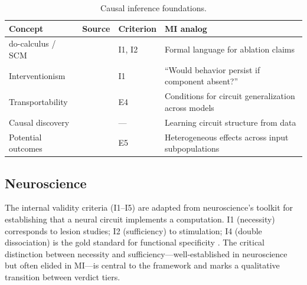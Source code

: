 \documentclass{article}
\begin{document}
\begin{table}[H]
\centering\small
\caption{Causal inference foundations.}
\renewcommand{\arraystretch}{1.12}
\begin{tabular}{@{}l>{\raggedright\arraybackslash}p{2.5cm}l>{\raggedright\arraybackslash}p{4.2cm}@{}}
\toprule
\textbf{Concept} & \textbf{Source} & \textbf{Criterion} & \textbf{MI analog} \\
\midrule
do-calculus / SCM & \citet{pearl2009causality} & I1, I2 & Formal language for ablation claims \\
\midrule
Interventionism & \citet{woodward2003making} & I1 & ``Would behavior persist if component absent?'' \\
\midrule
Transportability & \citet{pearl2011transportability} & E4 & Conditions for circuit generalization across models \\
\midrule
Causal discovery & \citet{spirtes2000causation} & --- & Learning circuit structure from data \\
\midrule
Potential outcomes & \citet{rubin1974estimating} & E5 & Heterogeneous effects across input subpopulations \\
\bottomrule
\end{tabular}
\end{table}


\subsection{Neuroscience}
\label{sec:neuro}

The internal validity criteria (I1--I5) are adapted from neuroscience's toolkit for establishing that a neural circuit implements a computation. I1 (necessity) corresponds to lesion studies; I2 (sufficiency) to stimulation; I4 (double dissociation) is the gold standard for functional specificity \citep{woodward2003making}. The critical distinction between necessity and sufficiency---well-established in neuroscience but often elided in MI---is central to the framework and marks a qualitative transition between verdict tiers.
\end{document}
